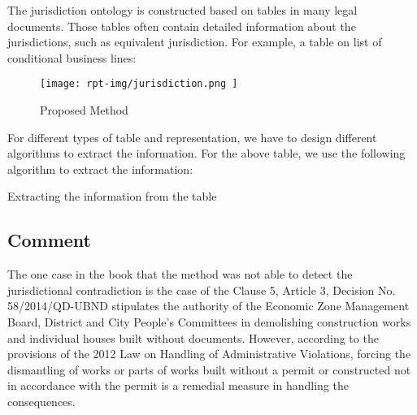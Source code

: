\begin{algorithm}
The jurisdiction ontology is constructed based on tables in many legal documents. Those tables often contain detailed information about the jurisdictions, such as equivalent jurisdiction. For example, a table on list of conditional business lines:

\begin{figure}[H]
    \centering
    \texttt{[image: rpt-img/jurisdiction.png     ]}
    \caption{Proposed Method}
    \label{fig:proposedmethod}
\end{figure}

For different types of table and representation, we have to design different algorithms to extract the information. For the above table, we use the following algorithm to extract the information:


\begin{algorithm}
    \caption{Extracting the information from the table}
\end{algorithm}

\subsection{Comment}

The one case in the book that the method was not able to detect the jurisdictional contradiction is the case of the Clause 5, Article 3, Decision No. 58/2014/QD-UBND stipulates the authority of the Economic Zone Management Board, District and City People's Committees in demolishing construction works and individual houses built without documents. However, according to the provisions of the 2012 Law on Handling of Administrative Violations, forcing the dismantling of works or parts of works built without a permit or constructed not in accordance with the permit is a remedial measure in handling the consequences.


\end{algorithm}
